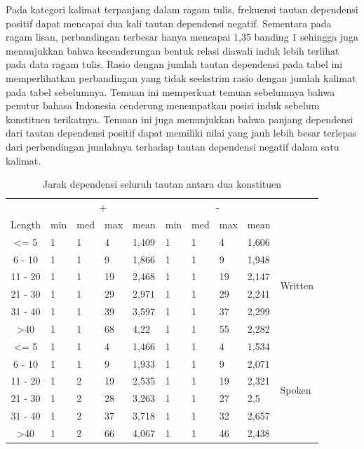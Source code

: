 \documentclass[10pt, a4paper, conference, compsocconf]{IEEEtran}
\begin{document}
Pada kategori kalimat terpanjang dalam ragam tulis, frekuensi tautan dependensi positif dapat mencapai dua kali tautan dependensi negatif. Sementara pada ragam lisan, perbandingan terbesar hanya mencapai 1,35 banding 1 sehingga juga menunjukkan bahwa kecenderungan bentuk relasi diawali induk lebih terlihat pada data ragam tulis. Rasio dengan jumlah tautan dependensi pada tabel ini memperlihatkan perbandingan yang tidak seekstrim rasio dengan jumlah kalimat pada tabel sebelumnya. Temuan ini memperkuat temuan sebelumnya bahwa penutur bahasa Indonesia cenderung menempatkan posisi induk sebelum konstituen terikatnya. Temuan ini juga menunjukkan bahwa panjang dependensi dari tautan dependensi positif dapat memiliki nilai yang jauh lebih besar terlepas dari perbendingan jumlahnya terhadap tautan dependensi negatif dalam satu kalimat.

\begin{table}
\begin{center}
\caption{Jarak dependensi seluruh tautan antara dua konstituen}  \label{tab:deskriptif-konstituen}
\begin{tabular}{c l l l l l l l l l}
\hline
 & \multicolumn{4}{c}{+} & \multicolumn{4}{c}{-} & \\  \cline{2-9}  
Length & min & med	& max & mean & min & med & max & mean & \\ \cline{1-10}  
\textless= 5 	& 1 & 1 & 4 & 1,409 	& 1 & 1 & 4 & 1,606 & \multirow{6}{*}{Written}\\
6 - 10 		& 1 & 1 & 9 & 1,866 	& 1 & 1 & 9 & 1,948 & \\
11 - 20 		& 1 & 1 & 19 & 2,468 & 1 & 1 & 19 & 2,147 & \\
21 - 30 		& 1 & 1 & 29 & 2,971 & 1 & 1 & 29 & 2,241 & \\ 
31 - 40 		& 1 & 1 & 39 & 3,597 & 1 & 1 & 37 & 2,299 & \\
\textgreater 40 & 1 & 1 & 68 & 4,22 	& 1 & 1 & 55 & 2,282 & \\ 
\hline
\textless= 5 	& 1 & 1 & 4 & 1,466 	& 1 & 1 & 4 & 1,534 & \multirow{6}{*}{Spoken}\\
6 - 10 		& 1 & 1 & 9 & 1,933 	& 1 & 1 & 9 & 2,071 & \\
11 - 20 		& 1 & 2 & 19 & 2,535 & 1 & 1 & 19 & 2,321 & \\
21 - 30 		& 1 & 2 & 28 & 3,263 & 1 & 1 & 27 & 2,5 & \\ 
31 - 40 		& 1 & 2 & 37 & 3,718 & 1 & 1 & 32 & 2,657 & \\
\textgreater 40 & 1 & 2 & 66 & 4,067 	& 1 & 1 & 46 & 2,438 & \\ 
\hline
   \end{tabular}
\end{center}
\end{table}
\end{document}
